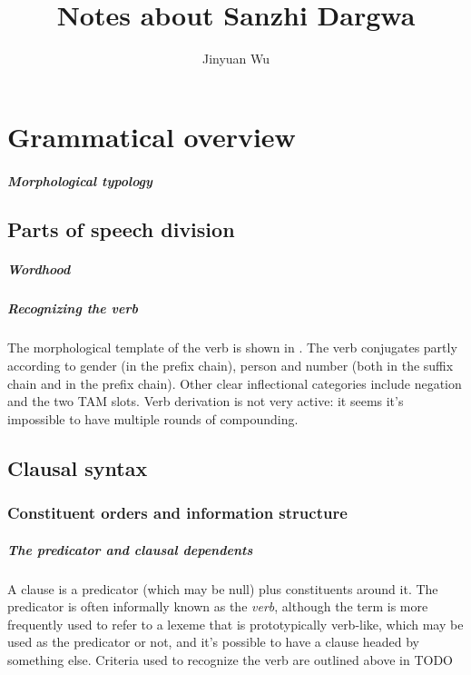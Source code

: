 \documentclass[a4paper, oneside, 12pt]{report}
\title{Notes about Sanzhi Dargwa}
\author{Jinyuan Wu}
\newcommand*{\citetable}[1]{Table~{#1}}
\begin{document}
\maketitle

\chapter{Grammatical overview}




\paragraph*{Morphological typology}

\section{Parts of speech division}

\paragraph*{Wordhood}

\paragraph*{Recognizing the verb}
The morphological template of the verb
is shown in \citet[\citetable{11.9}]{forker2020grammar}.
The verb conjugates partly according to
gender (in the prefix chain), person and number 
(both in the suffix chain and in the prefix chain). 
Other clear inflectional categories include 
negation and the two TAM slots.
Verb derivation is not very active:
it seems it's impossible to have multiple rounds of compounding.

\section{Clausal syntax}

\subsection{Constituent orders and information structure}

\paragraph*{The predicator and clausal dependents} 
A clause is a predicator (which may be null) plus constituents around it.
The predicator is often informally known as the \emph{verb}, 
although the term is more frequently used to refer to a lexeme that is prototypically verb-like, 
which may be used as the predicator or not, 
and it's possible to have a clause headed by something else. 
Criteria used to recognize the verb are outlined above in TODO 
\end{document}
